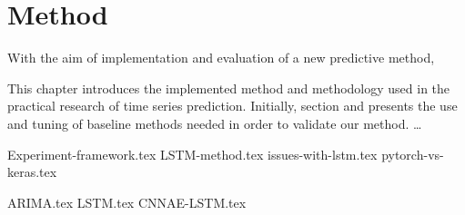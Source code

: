 \chapter{Method}
\label{section:Method}

With the aim of implementation and evaluation of a new predictive method,

This chapter introduces the implemented method and methodology used in the practical research of time series prediction.
Initially, section  and  presents the use and tuning of baseline methods needed in order to validate our method.
\dots

{Experiment-framework.tex}
{LSTM-method.tex}
{issues-with-lstm.tex}
{pytorch-vs-keras.tex}


{ARIMA.tex}
{LSTM.tex}
{CNNAE-LSTM.tex}
